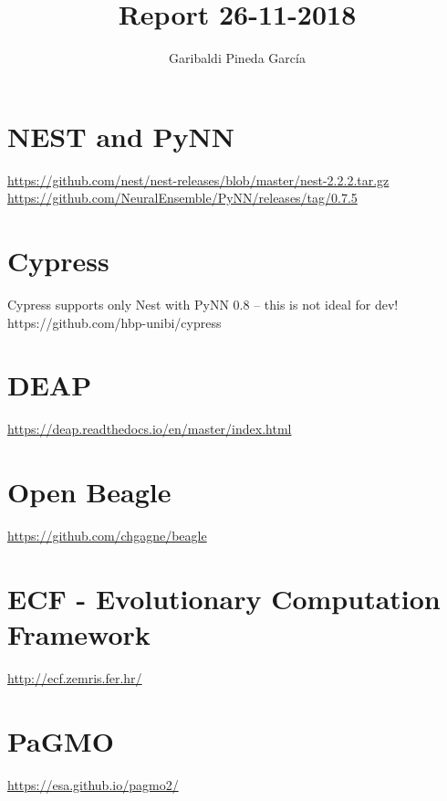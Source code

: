 \documentclass[11pt,a4paper]{article}
\author{Garibaldi Pineda Garc{\'i}a}
\title{Report 26-11-2018}
\begin{document}
\maketitle

\section{NEST and PyNN}
\url{https://github.com/nest/nest-releases/blob/master/nest-2.2.2.tar.gz}
\url{https://github.com/NeuralEnsemble/PyNN/releases/tag/0.7.5}

\section{Cypress}
Cypress supports only Nest with PyNN 0.8 -- this is not ideal for dev!
https://github.com/hbp-unibi/cypress

\section{DEAP}
\url{https://deap.readthedocs.io/en/master/index.html}

\section{Open Beagle}
\url{https://github.com/chgagne/beagle}

\section{ECF - Evolutionary Computation Framework}
\url{http://ecf.zemris.fer.hr/}

\section{PaGMO}
\url{https://esa.github.io/pagmo2/}
\end{document}
